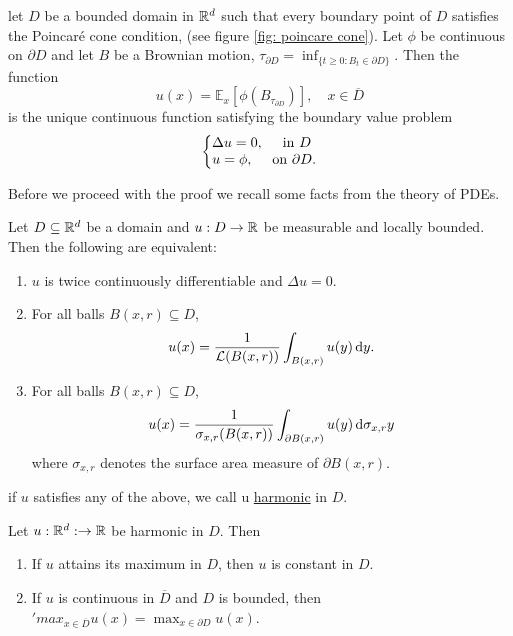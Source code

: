 \documentclass{article}
\begin{document}
\begin{theorem}\label{thm: dirichlet problem}

	let $ D$ be a bounded domain in $ \mathbb{R}^{d}$ such that every boundary point of $D$ satisfies the Poincar\'{e} cone condition, (see figure \ref{fig: poincare cone}). Let $\phi$ be continuous on $ \partial D$ and let $ B$ be a Brownian motion, $ \tau_{\partial D} = \displaystyle\inf_{\{t\geq 0 : B_{t}\in \partial D\}}$. Then the function 
	\[
		u(x)  = \mathbb{E}_{x}\left[ \phi(B_{\tau_{\partial D}}) \right], \quad x\in \overline{D}
	\]
	is the unique continuous function satisfying the boundary value problem 
	\[
	\left\lbrace
	\begin{array}{@{}l@{}}
	    \Delta u = 0, \quad \text{ in } D \\
	    u = \phi, \quad \text{ on }\partial D.
	\end{array}\right.
	\]
\end{theorem}

Before we proceed with the proof we recall some facts from the theory of PDEs. 

\begin{theorem}\label{thm: harmonic functions}
Let $ D\subseteq \mathbb{R}^{d}$ be a domain and $ u:D\to \mathbb{R}$ be measurable and locally bounded. Then the following are equivalent:
\begin{enumerate}
	\item $ u$ is twice continuously differentiable and $ \Delta u=0$.
	\item For all balls $B(x,r)\subseteq D $, 
		\[
		u(x) = \frac{1}{\mathcal{L}(B(x,r))} \displaystyle\int_{B(x,r)}u(y) \operatorname{d}\! y .  
		\]
	\item For all balls $ B(x,r)\subseteq D$, 
		\[
		u(x) = \frac{1}{\sigma_{x,r}(B(x,r))} \displaystyle\int_{\partial B(x,r)}u(y) \operatorname{d}\!\sigma_{x,r} y 
		\]
		where $ \sigma_{x,r}$ denotes the surface area measure of $ \partial B(x,r)$.
\end{enumerate}
\end{theorem}

\begin{boxdef}[Harmonic]\label{def: harmonic function}
	if $ u$ satisfies any of the above, we call u \underline{harmonic} in $ D$. 
\end{boxdef}

\begin{theorem}\label{thm: maximum principle}
Let $ u:\mathbb{R}^{d}:\to \mathbb{R}$ be harmonic in $ D$. Then 
\begin{enumerate}
\item If $ u$ attains its maximum in $ D$, then $ u$ is constant in $ D$. 
\item If $u$ is continuous in $ \overline{D}$ and $ D$ is bounded, then $ \displaystyle'max_{x\in \overline{D}}u(x) = \displaystyle\max_{x\in \partial D}u(x)$.
\end{enumerate}
\end{theorem}
\end{document}
